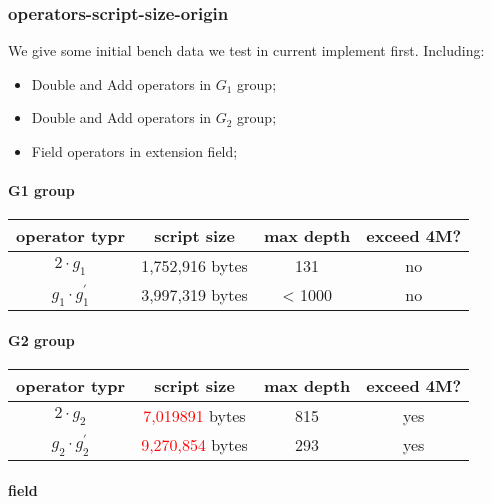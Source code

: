 \subsubsection{operators-script-size-origin}

We give some initial bench data we test in current implement first. Including:

\begin{itemize}
    \item Double and Add operators in $G_1$ group;
    \item Double and Add operators in $G_2$ group;
    \item Field operators in extension field;
\end{itemize}

\paragraph*{G1 group}

\begin{center}
\begin{tabular}{|c|c|c|c|} \hline
operator typr & script size & max depth & exceed 4M? \\ \hline
$2 \cdot g_1$ & 1,752,916 bytes & 131 & no  \\ \hline
$g_1 \cdot g_1^{'}$ & 3,997,319 bytes &	< 1000 & no \\ \hline
\end{tabular}
\end{center}

\paragraph*{G2 group}

\begin{center}
\begin{tabular}{|c|c|c|c|} \hline
operator typr & script size & max depth & exceed 4M? \\ \hline
$2 \cdot g_2$ & \textcolor{red}{7,019891} bytes & 815 & yes  \\ \hline
$g_2 \cdot g_2^{'}$ & \textcolor{red}{9,270,854} bytes &	293 & yes \\ \hline
\end{tabular}
\end{center}

\paragraph*{field}

